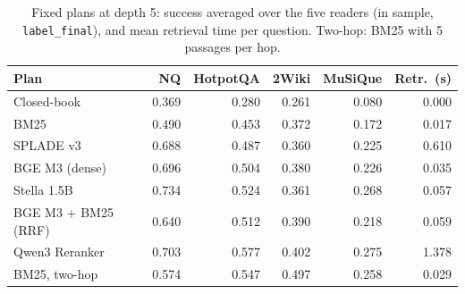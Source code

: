 \begin{table}[t]
\centering\footnotesize
\setlength{\tabcolsep}{3pt}
\caption{Fixed plans at depth 5: success averaged over the five readers (in sample, \texttt{label\_final}), and mean retrieval time per question. Two-hop: BM25 with 5 passages per hop.}
\label{tab:p_retrievers}
\begin{tabular*}{\linewidth}{@{\extracolsep{\fill}}lrrrrr@{}}
\toprule
Plan & NQ & HotpotQA & 2Wiki & MuSiQue & Retr.\ (s) \\
\midrule
Closed-book & 0.369 & 0.280 & 0.261 & 0.080 & 0.000 \\
BM25 & 0.490 & 0.453 & 0.372 & 0.172 & 0.017 \\
SPLADE v3 & 0.688 & 0.487 & 0.360 & 0.225 & 0.610 \\
BGE M3 (dense) & 0.696 & 0.504 & 0.380 & 0.226 & 0.035 \\
Stella 1.5B & 0.734 & 0.524 & 0.361 & 0.268 & 0.057 \\
BGE M3 + BM25 (RRF) & 0.640 & 0.512 & 0.390 & 0.218 & 0.059 \\
Qwen3 Reranker & 0.703 & 0.577 & 0.402 & 0.275 & 1.378 \\
BM25, two-hop & 0.574 & 0.547 & 0.497 & 0.258 & 0.029 \\
\bottomrule
\end{tabular*}
\end{table}
